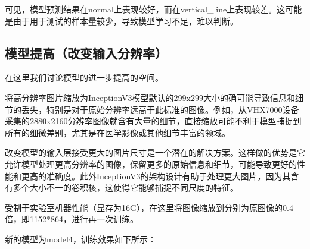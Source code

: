 可见，模型预测结果在normal上表现较好，而在vertical\_line上表现较差。这可能是由于用于测试的样本量较少，导致模型学习不足，难以判断。


\subsection{模型提高（改变输入分辨率）}

在这里我们讨论模型的进一步提高的空间。

将高分辨率图片缩放为InceptionV3模型默认的299x299大小的确可能导致信息和细节的丢失，特别是对于原始分辨率远高于此标准的图像。例如，从VHX7000设备采集的2880x2160分辨率图像就含有大量的细节，直接缩放可能不利于模型捕捉到所有的细微差别，尤其是在医学影像或其他细节丰富的领域。

改变模型的输入层接受更大的图片尺寸是一个潜在的解决方案。这样做的优势是它允许模型处理更高分辨率的图像，保留更多的原始信息和细节，可能导致更好的性能和更高的准确度。此外InceptionV3的架构设计有助于处理更大图片，因为其含有多个大小不一的卷积核，这使得它能够捕捉不同尺度的特征。

受制于实验室机器性能（显存为16G），在这里将图像缩放到分别为原图像的0.4倍，即1152*864，进行再一次训练。

新的模型为model4，训练效果如下所示：

